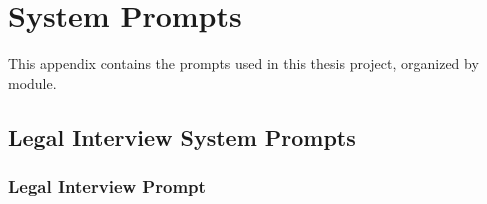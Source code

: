 
\chapter{System Prompts}
\label{app:prompts}

This appendix contains the prompts used in this thesis project, organized by module.

\section{Legal Interview System Prompts}
\label{sec:legal-interview-prompts}

\subsection{Legal Interview Prompt}
\label{subsec:legal-interview-prompt}
